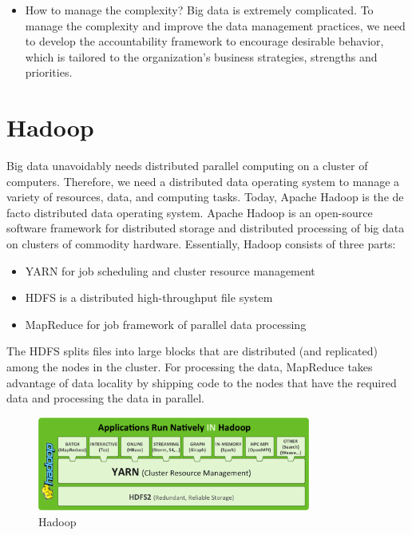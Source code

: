 \documentclass[11pt]{book}
\begin{document}
\begin{itemize}
\item How to manage the complexity? Big data is extremely complicated. To manage the complexity and improve the data management practices, we need to develop the accountability framework to encourage desirable behavior, which is tailored to the organization's business strategies, strengths and priorities.
\end{itemize}



\chapter[Hadoop]
{Hadoop}
Big data unavoidably needs distributed parallel computing on a cluster of computers. Therefore, we need a distributed data operating system to manage a variety of resources, data, and computing tasks. Today, Apache Hadoop \cite{Hadoop} is the de facto distributed data operating system. Apache Hadoop is an open-source software framework for distributed storage and distributed processing of big data on clusters of commodity hardware. Essentially, Hadoop consists of three parts:
\begin{itemize}
\item YARN for job scheduling and cluster resource management
\item HDFS is a distributed high-throughput file system
\item MapReduce for job framework of parallel data processing
\end{itemize}
The HDFS splits files into large blocks that are distributed (and replicated) among the nodes in the cluster. For processing the data, MapReduce takes advantage of data locality by shipping code to the nodes that have the required data and processing the data in parallel.

\begin{figure}[t]
\includegraphics[width=0.8\textwidth]{images/hadoop.png}
\centering
\caption{Hadoop}
\end{figure}
\end{document}
